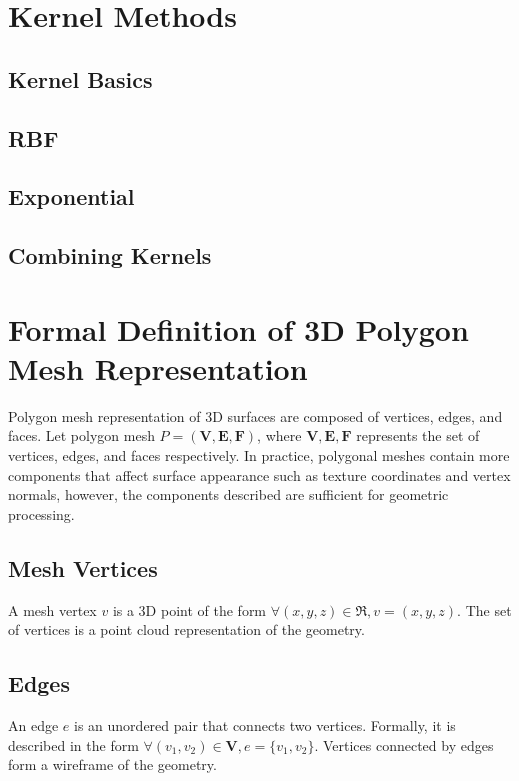 \documentclass[ %
                    author={Dillon Keith Diep},
                supervisor={Dr. Carl Henrik Ek},
                    degree={MEng},
                     title={Assisted Content Generation for 3D Hair Geometry},
                  subtitle={[INCOMPLETE DRAFT, NOT FOR SUBMISSION]},
                      type={Research},
                      year={2014} ]{dissertation}
\begin{document}
\section{Kernel Methods}
\subsection{Kernel Basics}
\subsection{RBF}
\subsection{Exponential}
\subsection{Combining Kernels}

\section{Formal Definition of 3D Polygon Mesh Representation}

Polygon mesh representation of 3D surfaces are composed of vertices, edges, and faces. Let polygon mesh $P = (\mathbf{V, E, F})$, where $\mathbf{V, E, F}$ represents the set of vertices, edges, and faces respectively. In practice, polygonal meshes contain more components that affect surface appearance such as texture coordinates and vertex normals, however, the components described are sufficient for geometric processing.

\subsection{Mesh Vertices}
A mesh vertex $v$ is a 3D point of the form $\forall (x, y, z) \in \Re, v = (x, y, z)$.
The set of vertices is a point cloud representation of the geometry. 

\subsection{Edges}
An edge $e$ is an unordered pair that connects two vertices. Formally, it is described in the form $\forall (v_1, v_2) \in \mathbf{V}, e = \{v_1, v_2\}$. Vertices connected by edges form a wireframe of the geometry. 
\end{document}

